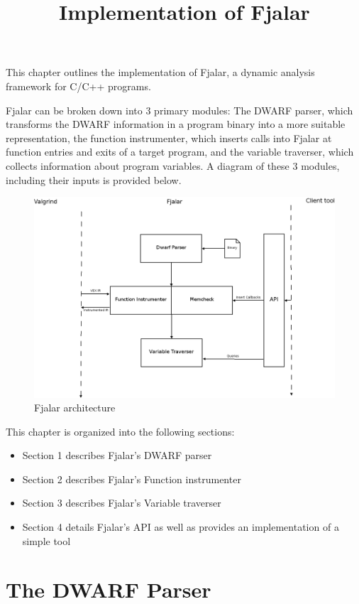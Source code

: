 \documentclass{article}
\title{Implementation of Fjalar}
\date{}
\author{}
\begin{document}
 \maketitle
This chapter outlines the implementation of Fjalar, a dynamic analysis
framework for C/C++ programs. 

Fjalar can be broken down into 3 primary modules: The DWARF parser,
which transforms the DWARF information in a program
binary into a more suitable representation, the function
instrumenter, which inserts calls into Fjalar at function entries and
exits of a target program, and the variable traverser, which
collects information about program variables. A diagram of these 3
modules, including their inputs is provided below.

\begin{figure}
\noindent
\centering
\includegraphics[width=150mm]{fjalar-arch-initial}
\caption{Fjalar architecture}
\end{figure}

This chapter is organized into the following sections: 

\begin{itemize}
\item Section 1 describes Fjalar's DWARF parser
\item Section 2 describes Fjalar's Function instrumenter
\item Section 3 describes Fjalar's Variable traverser
\item Section 4 details Fjalar's API as well as provides an
  implementation of a simple tool
\end{itemize}

\section{The DWARF Parser}
\end{document}
